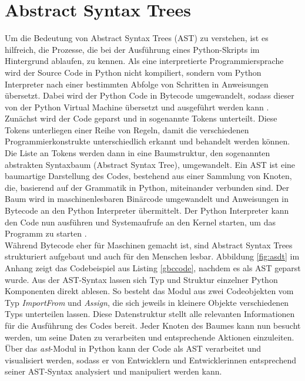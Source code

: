 \documentclass[german,bachelor]{swsLeipzig}
\begin{document}
\section{Abstract Syntax Trees}
Um die Bedeutung von Abstract Syntax Trees (AST) zu verstehen, ist es hilfreich, die Prozesse, die
bei der Ausführung eines Python-Skripts im Hintergrund ablaufen, zu kennen.
Als eine interpretierte Programmiersprache wird der Source Code in Python nicht kompiliert, sondern vom
Python Interpreter nach einer bestimmten Abfolge von Schritten in Anweisungen übersetzt.
Dabei wird der Python Code in Bytecode umgewandelt, sodass dieser von der Python Virtual Machine
übersetzt und ausgeführt werden kann \cite[]{aycock1998compiling}. \\
\indent Zunächst wird der Code geparst und in sogenannte Tokens unterteilt.
Diese Tokens unterliegen einer Reihe von Regeln, damit die verschiedenen Programmierkonstrukte unterschiedlich erkannt
und behandelt werden können.
Die Liste an Tokens werden dann in eine Baumstruktur, den sogenannten abstrakten Syntaxbaum (Abstract Syntax Tree), umgewandelt.
Ein AST ist eine baumartige Darstellung des Codes, bestehend aus einer Sammlung von Knoten, die, basierend auf der Grammatik
in Python, miteinander verbunden sind.
Der Baum wird in maschinenlesbaren Binärcode umgewandelt und Anweisungen in Bytecode an den Python Interpreter übermittelt.
Der Python Interpreter kann den Code nun ausführen und Systemaufrufe an den Kernel starten, um das Programm zu starten \cite[]{aycock1998compiling}. \\

Während Bytecode eher für Maschinen gemacht ist, sind Abstract Syntax Trees strukturiert aufgebaut und auch für den Menschen lesbar.
Abbildung \ref{fig:asdt} im Anhang zeigt das Codebeispiel aus Listing \ref{gbccode}, nachdem es als AST geparst wurde.
Aus der AST-Syntax lassen sich Typ und Struktur einzelner Python Komponenten direkt ablesen.
So besteht das Modul aus zwei Codeobjekten vom Typ \textit{ImportFrom} und \textit{Assign}, die sich jeweils in kleinere
Objekte verschiedenen Typs unterteilen lassen.
Diese Datenstruktur stellt alle relevanten Informationen für die Ausführung des Codes bereit.
Jeder Knoten des Baumes kann nun besucht werden, um seine Daten zu verarbeiten und entsprechende Aktionen einzuleiten.
Über das \textit{ast}-Modul in Python kann der Code als AST verarbeitet und visualisiert werden, sodass er von
Entwicklern und Entwicklerinnen entsprechend seiner AST-Syntax analysiert und manipuliert werden kann.\\
\end{document}
